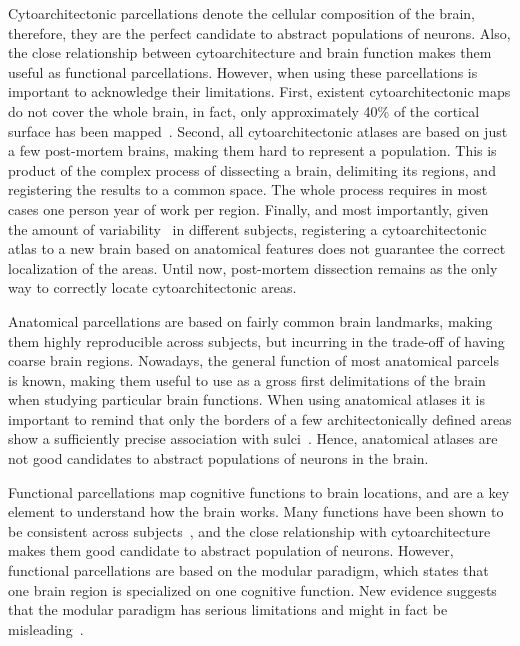 Cytoarchitectonic parcellations denote the cellular composition of the brain,
therefore, they are the perfect candidate to abstract populations of neurons.
Also, the close relationship between cytoarchitecture and brain function\cite{Amunts2007}
makes them useful as functional parcellations.
However, when using these parcellations is important to acknowledge their limitations.
First, existent cytoarchitectonic maps do not cover the whole brain, in fact, only 
approximately 40\% of the cortical surface has been mapped~\cite{Amunts2007}. Second, all cytoarchitectonic atlases are based on just
a few post-mortem brains, making them hard to represent a population. This is
product of the complex process of dissecting a brain, delimiting its regions,
and registering the results to a common space. The whole process requires in most
cases one person year of work per region. Finally, and most importantly, given the
amount of variability~\cite{Zilles2013} in different subjects, registering a 
cytoarchitectonic atlas to a new brain based on anatomical features does not
guarantee the correct localization of the areas. Until now, post-mortem dissection
remains as the only way to correctly locate cytoarchitectonic areas.

Anatomical parcellations are based on fairly common brain landmarks, making them
highly reproducible across subjects, but incurring in the trade-off of having coarse
brain regions. Nowadays, the general function of most anatomical parcels is
known, making them useful to use as a gross first delimitations of the brain
when studying particular brain functions. When using anatomical atlases it is
important to remind that only the borders of a few architectonically
defined areas show a sufficiently precise association with sulci~\cite{Amunts2007}.
Hence, anatomical atlases are not good candidates to abstract populations
of neurons in the brain.

Functional parcellations map cognitive functions to brain locations, and are
a key element to understand how the brain works. Many functions have been shown
to be consistent across subjects~\cite{Johns, Penfield1954, Yeo2011},
and the close relationship with cytoarchitecture makes them good candidate to
abstract population of neurons. However, functional parcellations are based
on the modular paradigm, which states that one brain region is specialized
on one cognitive function. New evidence suggests that the modular paradigm has serious
limitations and might in fact be misleading~\cite{Bressler2010}.

